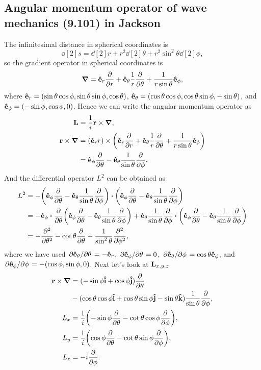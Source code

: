 \documentclass[10pt]{article}
\begin{document}
\subsection{Angular momentum operator of wave mechanics (9.101) in Jackson}
The infinitesimal distance in spherical coordinates is
\begin{equation}
	\dd[2]{s} = \dd[2]{r} + r^2 \dd[2]{\theta} + r^2 \sin^2{\theta} \dd[2]{\phi},
\end{equation}
so the gradient operator in spherical coordinates is
\begin{equation}
	\grad = \vu{e}_r \pdv{r} + \vu{e}_{\theta} \frac{1}{r} \pdv{\theta} + \frac{1}{r \sin{\theta}} \vu{e}_{\phi},
\end{equation}
where $\vu{e}_r = (\sin{\theta}\cos{\phi}, \sin{\theta}\sin{\phi}, \cos{\theta})$, $\vu{e}_{\theta} = (\cos{\theta} \cos{\phi}, \cos{\theta} \sin{\phi}, - \sin{\theta})$,
and $\vu{e}_{\phi} = (-\sin{\phi}, \cos{\phi}, 0)$.
Hence we can write the angular momentum operator as
\begin{align*}
	\vb{L} &= \frac{1}{i} \vb{r} \times \grad, \\
	\vb{r} \times \grad &= (\vu{e}_r r) \times \qty(\vu{e}_r \pdv{r} + \vu{e}_{\theta} \frac{1}{r} \pdv{\theta} + \frac{1}{r \sin{\theta}} \vu{e}_{\phi}) \\
	&= \vu{e}_{\phi} \pdv{\theta} - \vu{e}_{\theta} \frac{1}{\sin{\theta}} \pdv{\phi}.
\end{align*}
And the differential operator $L^2$ can be obtained as
\begin{align*}
	L^2 &= -\qty(\vu{e}_{\phi} \pdv{\theta} - \vu{e}_{\theta} \frac{1}{\sin{\theta}} \pdv{\phi}) \vdot \qty(\vu{e}_{\phi} \pdv{\theta} - \vu{e}_{\theta} \frac{1}{\sin{\theta}} \pdv{\phi}) \\
	&= - \vu{e}_{\phi} \vdot \pdv{\theta} \qty(\vu{e}_{\phi} \pdv{\theta} - \vu{e}_{\theta} \frac{1}{\sin{\theta}} \pdv{\phi})
	+ \vu{e}_{\theta} \frac{1}{\sin{\theta}} \pdv{\phi} \vdot \qty(\vu{e}_{\phi} \pdv{\theta} - \vu{e}_{\theta} \frac{1}{\sin{\theta}} \pdv{\phi}) \\
	&= -\pdv[2]{\theta} - \cot{\theta} \pdv{\theta} -\frac{1}{\sin^2{\theta}} \pdv[2]{\phi},
\end{align*}
where we have used $\pdv*{\vu{e}_{\theta}}{\theta} = -\vu{e}_r$, $\pdv*{\vu{e}_{\phi}}{\theta} = 0$, $\pdv*{\vu{e}_{\theta}}{\phi} = \cos{\theta} \vu{e}_{\phi}$,
and $\pdv*{\vu{e}_{\phi}}{\phi} = -(\cos{\phi}, \sin{\phi}, 0)$.
Next let's look at $\vb{L}_{x,y,z}$
\begin{align*}
	\vb{r} \times \grad &= (-\sin{\phi} \vu{i} + \cos{\phi} \vu{j}) \pdv{\theta} \\
	&- (\cos{\theta} \cos{\phi} \vu{i} + \cos{\theta} \sin{\phi} \vu{j} - \sin{\theta} \vu{k}) \frac{1}{\sin{\theta}} \pdv{\phi}, \\
	L_x &= \frac{1}{i}\qty(-\sin{\phi}\pdv{\theta} - \cot{\theta}\cos{\phi}\pdv{\phi}), \\
	L_y &= \frac{1}{i}\qty(\cos{\phi}\pdv{\theta} - \cot{\theta}\sin{\phi}\pdv{\phi}), \\
	L_z &= -i\pdv{\phi}.
\end{align*}
\end{document}
